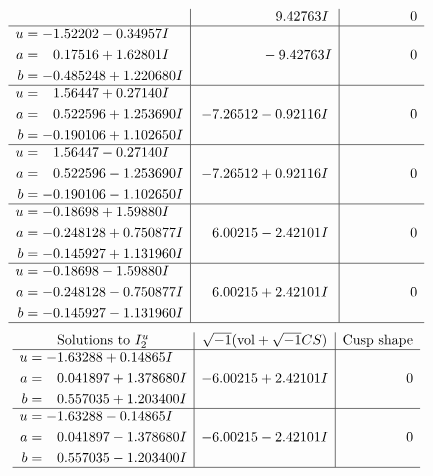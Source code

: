 \documentclass[1p]{elsarticle_modified}
\theoremstyle{definition}
\newcommand{\I}{\sqrt{-1}}
\begin{document}
$$\begin{array}{c|c|c}
 & \phantom{-0.000000 -}9.42763 I & \phantom{-0.000000 } 0 \\ \hline\begin{aligned}
u &= -1.52202 - 0.34957 I \\
a &= \phantom{-}0.17516 + 1.62801 I \\
b &= -0.485248 + 1.220680 I\end{aligned}
 & \phantom{-0.000000 } -9.42763 I & \phantom{-0.000000 } 0 \\ \hline\begin{aligned}
u &= \phantom{-}1.56447 + 0.27140 I \\
a &= \phantom{-}0.522596 + 1.253690 I \\
b &= -0.190106 + 1.102650 I\end{aligned}
 & -7.26512 - 0.92116 I & \phantom{-0.000000 } 0 \\ \hline\begin{aligned}
u &= \phantom{-}1.56447 - 0.27140 I \\
a &= \phantom{-}0.522596 - 1.253690 I \\
b &= -0.190106 - 1.102650 I\end{aligned}
 & -7.26512 + 0.92116 I & \phantom{-0.000000 } 0 \\ \hline\begin{aligned}
u &= -0.18698 + 1.59880 I \\
a &= -0.248128 + 0.750877 I \\
b &= -0.145927 + 1.131960 I\end{aligned}
 & \phantom{-}6.00215 - 2.42101 I & \phantom{-0.000000 } 0 \\ \hline\begin{aligned}
u &= -0.18698 - 1.59880 I \\
a &= -0.248128 - 0.750877 I \\
b &= -0.145927 - 1.131960 I\end{aligned}
 & \phantom{-}6.00215 + 2.42101 I & \phantom{-0.000000 } 0\\
 \hline 
 \end{array}$$\newpage$$\begin{array}{c|c|c}  
\text{Solutions to }I^u_{2}& \I (\text{vol} + \sqrt{-1}CS) & \text{Cusp shape}\\
 \hline 
\begin{aligned}
u &= -1.63288 + 0.14865 I \\
a &= \phantom{-}0.041897 + 1.378680 I \\
b &= \phantom{-}0.557035 + 1.203400 I\end{aligned}
 & -6.00215 + 2.42101 I & \phantom{-0.000000 } 0 \\ \hline\begin{aligned}
u &= -1.63288 - 0.14865 I \\
a &= \phantom{-}0.041897 - 1.378680 I \\
b &= \phantom{-}0.557035 - 1.203400 I\end{aligned}
 & -6.00215 - 2.42101 I & \phantom{-0.000000 } 0\\
 \hline 
 \end{array}$$\newpage\newpage\renewcommand{\arraystretch}{1}
\end{document}
